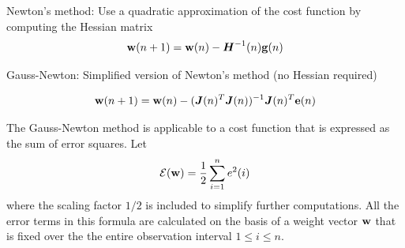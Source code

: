 \documentclass[10pt]{article}
\newcommand{\vect}[1]{{\bf{#1}}}
\newcommand{\matr}[1]{\boldsymbol{#1}}
\begin{document}
\begin{enumerate}
Newton's method: Use a quadratic approximation of the cost function by
computing the Hessian matrix
\[
\vect{w}(n+1) = \vect{w}(n) - \matr{H}^{-1}(n) \vect{g}(n)
\]

Gauss-Newton: Simplified version of Newton's method (no Hessian required)

\[
\vect{w}(n+1) = \vect{w}(n) - (\matr{J}(n)^T\matr{J}(n))^{-1} \matr{J}(n)^T \vect{e}(n)
\]


The Gauss-Newton method is applicable to a cost function that is
expressed as the sum of error squares. Let
\[
\mathcal{E}(\vect{w})=\frac{1}{2}\sum_{i=1}^{n} e^2(i)
\]
where the scaling factor $1/2$ is included to simplify further
computations. All the error terms in this formula are calculated on
the basis of a weight vector $\vect{w}$ that is fixed over the the entire
observation interval $1\leq i\leq n$.


\end{enumerate}
\end{document}
